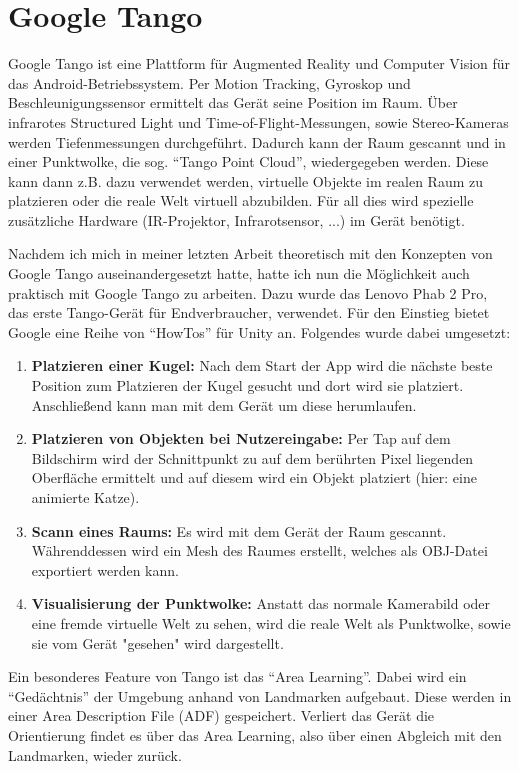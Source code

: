 
\section{Google Tango}
Google Tango ist eine Plattform für Augmented Reality und Computer Vision für das Android-Betriebssystem. Per Motion Tracking, Gyroskop und Beschleunigungssensor ermittelt das Gerät seine Position im Raum. Über infrarotes Structured Light und Time-of-Flight-Messungen, sowie Stereo-Kameras werden Tiefenmessungen durchgeführt. Dadurch kann der Raum gescannt und in einer Punktwolke, die sog. "`Tango Point Cloud"', wiedergegeben werden. Diese kann dann z.B. dazu verwendet werden, virtuelle Objekte im realen Raum zu platzieren oder die reale Welt virtuell abzubilden. Für all dies wird spezielle zusätzliche Hardware (IR-Projektor, Infrarotsensor, ...) im Gerät benötigt. \cite{fehling}

Nachdem ich mich in meiner letzten Arbeit theoretisch mit den Konzepten von Google Tango auseinandergesetzt hatte, hatte ich nun die Möglichkeit auch praktisch mit Google Tango zu arbeiten. Dazu wurde das Lenovo Phab 2 Pro, das erste Tango-Gerät für Endverbraucher, verwendet. Für den Einstieg bietet Google eine Reihe von "`HowTos"' für Unity an. Folgendes wurde dabei umgesetzt:
\begin{enumerate}
	\item\textbf{Platzieren einer Kugel:} Nach dem Start der App wird die nächste beste Position zum Platzieren der Kugel gesucht und dort wird sie platziert. Anschließend kann man mit dem Gerät um diese herumlaufen.
	\item\textbf{Platzieren von Objekten bei Nutzereingabe:} Per Tap auf dem Bildschirm wird der Schnittpunkt zu auf dem berührten Pixel liegenden Oberfläche ermittelt und auf diesem wird ein Objekt platziert (hier: eine animierte Katze).
	\item\textbf{Scann eines Raums:} Es wird mit dem Gerät der Raum gescannt. Währenddessen wird ein Mesh des Raumes erstellt, welches als OBJ-Datei exportiert werden kann.
	\item\textbf{Visualisierung der Punktwolke:} Anstatt das normale Kamerabild oder eine fremde virtuelle Welt zu sehen, wird die reale Welt als Punktwolke, sowie sie vom Gerät "gesehen" wird dargestellt.
\end{enumerate}
Ein besonderes Feature von Tango ist das "`Area Learning"'. Dabei wird ein "`Gedächtnis"' der Umgebung anhand von Landmarken aufgebaut. Diese werden in einer Area Description File (ADF) gespeichert. Verliert das Gerät die Orientierung findet es über das Area Learning, also über einen Abgleich mit den Landmarken, wieder zurück.\cite{fehling}

